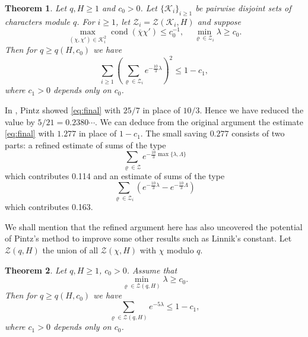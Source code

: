 \documentclass[10pt, reqno]{amsart}
\numberwithin{equation}{section}
\newtheorem{theorem}{Theorem}[section]
\newcommand{\bb}[1]{\left(#1\right)}
\renewcommand{\rho }{\operatorname{\varrho}}
\begin{document}
\begin{theorem}\label{thm:main2}
Let $q,H\geq 1$ and $c_0>0$. Let $\{\mathcal{K}_i\}_{i\geq 1}$ be pairwise disjoint sets of characters module $q$. For $i\geq1$, let $\mathcal{Z}_i=\mathcal{Z}(\mathcal{K}_i,H)$ and suppose
\begin{equation}\label{eq:Condition}
\max_{(\chi,\chi')\in \mathcal{K}_i^2}\operatorname{cond}(\overline{\chi} \chi')\leq c_0^{-1},\quad \min_{\rho \in \mathcal{Z}_i} \lambda \geq c_0.
\end{equation}
Then for $q\geq q(H,c_0)$ we have
\begin{equation}\label{eq:final}
\sum_{i\geq 1} \bb{\sum_{\rho \in \mathcal{Z}_i} e^{-\frac{10}{3} \lambda}}^2 \leq 1-c_1,
\end{equation}
where $c_1>0$ depends only on $c_0$.
\end{theorem}

In \cite{Pintz2018}, Pintz showed \eqref{eq:final} with $25/7$ in place of $10/3$. Hence we have reduced the value  by $5/21= 0.2380\cdots$. We can deduce from   the original argument  the estimate \eqref{eq:final} with $1.277$ in place of $1-c_1$.  The small  saving $0.277$ consists of  two parts: a refined estimate of sums of the type
\begin{equation}\label{eq:SumType1}
\sum_{\rho \in \mathcal{Z}}e^{-\frac{10}{3}\max \{\lambda,\Lambda \}}
\end{equation}
which contributes 0.114 and an estimate of sums of the type
\begin{equation}\label{eq:SumType2}
\sum_{\rho \in \mathcal{Z}_i}(e^{-\frac{10}{3}\lambda }-e^{-\frac{10}{3}\Lambda})
\end{equation}
which contributes 0.163.

We shall mention that the refined argument here has also uncovered the potential of Pintz's method to improve some other results such as Linnik's constant. Let $\mathcal{Z}(q,H)$ the union of all $\mathcal{Z}(\chi,H)$ with $\chi$ modulo $q$.

\begin{theorem}\label{thm:main3}
Let $q,H\geq 1$, $c_0>0$. Assume that
\begin{equation}\label{eq:MinCondition}
\min_{\rho \in \mathcal{Z}(q,H)} \lambda \geq c_0.
\end{equation}
Then for $q\geq q(H,c_0)$ we have
\begin{equation}\label{eq:final2}
\sum_{\rho\in \mathcal{Z}(q,H) } e^{-5\lambda} \leq 1-c_1,
\end{equation}
where $c_1>0$ depends only on $c_0$.
\end{theorem}
\end{document}
